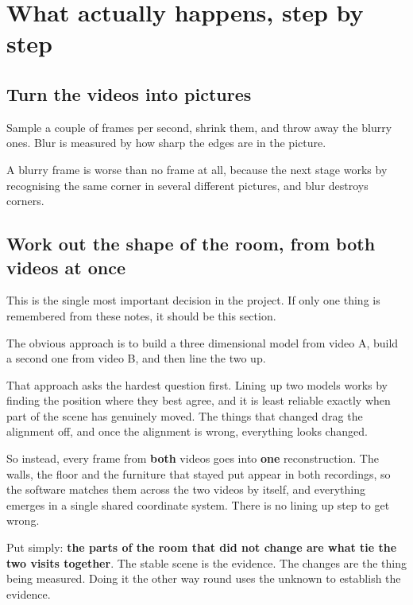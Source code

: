 \chapter{What actually happens, step by step}

\section{Turn the videos into pictures}

Sample a couple of frames per second, shrink them, and throw away the blurry ones. Blur is measured
by how sharp the edges are in the picture.

A blurry frame is worse than no frame at all, because the next stage works by recognising the same
corner in several different pictures, and blur destroys corners.

\section{Work out the shape of the room, from both videos at once}

\begin{watch}
This is the single most important decision in the project. If only one thing is remembered from
these notes, it should be this section.
\end{watch}

The obvious approach is to build a three dimensional model from video A, build a second one from
video B, and then line the two up.

That approach asks the hardest question first. Lining up two models works by finding the position
where they best agree, and it is least reliable exactly when part of the scene has genuinely moved.
The things that changed drag the alignment off, and once the alignment is wrong, everything looks
changed.

So instead, every frame from \textbf{both} videos goes into \textbf{one} reconstruction. The walls,
the floor and the furniture that stayed put appear in both recordings, so the software matches them
across the two videos by itself, and everything emerges in a single shared coordinate system. There
is no lining up step to get wrong.

\begin{plainbox}
Put simply: \textbf{the parts of the room that did not change are what tie the two visits
together}. The stable scene is the evidence. The changes are the thing being measured. Doing it the
other way round uses the unknown to establish the evidence.
\end{plainbox}

